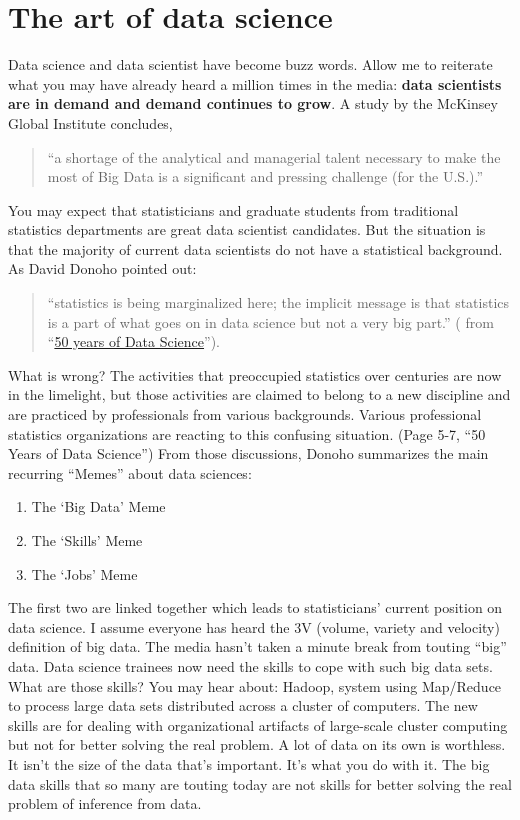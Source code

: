 \documentclass[]{book}
\providecommand{\tightlist}{%
  \setlength{\itemsep}{0pt}\setlength{\parskip}{0pt}}
\theoremstyle{definition}
\theoremstyle{definition}
\theoremstyle{remark}
\begin{document}
\chapter{The art of data science}\label{the-art-of-data-science}

Data science and data scientist have become buzz words. Allow me to
reiterate what you may have already heard a million times in the media:
\textbf{data scientists are in demand and demand continues to grow}. A
study by the McKinsey Global Institute concludes,

\begin{quote}
``a shortage of the analytical and managerial talent necessary to make
the most of Big Data is a significant and pressing challenge (for the
U.S.).''
\end{quote}

You may expect that statisticians and graduate students from traditional
statistics departments are great data scientist candidates. But the
situation is that the majority of current data scientists do not have a
statistical background. As David Donoho pointed out:

\begin{quote}
``statistics is being marginalized here; the implicit message is that
statistics is a part of what goes on in data science but not a very big
part.'' ( from
``\href{http://pages.cs.wisc.edu/~anhai/courses/784-fall15/50YearsDataScience.pdf}{50
years of Data Science}'').
\end{quote}

What is wrong? The activities that preoccupied statistics over centuries
are now in the limelight, but those activities are claimed to belong to
a new discipline and are practiced by professionals from various
backgrounds. Various professional statistics organizations are reacting
to this confusing situation. (Page 5-7, ``50 Years of Data Science'')
From those discussions, Donoho summarizes the main recurring ``Memes''
about data sciences:

\begin{enumerate}
\def\labelenumi{\arabic{enumi}.}
\tightlist
\item
  The `Big Data' Meme
\item
  The `Skills' Meme
\item
  The `Jobs' Meme
\end{enumerate}

The first two are linked together which leads to statisticians' current
position on data science. I assume everyone has heard the 3V (volume,
variety and velocity) definition of big data. The media hasn't taken a
minute break from touting ``big'' data. Data science trainees now need
the skills to cope with such big data sets. What are those skills? You
may hear about: Hadoop, system using Map/Reduce to process large data
sets distributed across a cluster of computers. The new skills are for
dealing with organizational artifacts of large-scale cluster computing
but not for better solving the real problem. A lot of data on its own is
worthless. It isn't the size of the data that's important. It's what you
do with it. The big data skills that so many are touting today are not
skills for better solving the real problem of inference from data.
\end{document}
